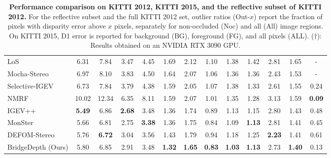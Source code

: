 \begin{table}[!t]
{\begin{tabular}{l c c c c c c c c c c c c}
		LoS~\cite{li2024local} & 6.31 & 7.84 & 3.47 & 4.45 & 1.69 & 2.12 & 1.10 & 1.38 & 1.42 & 2.81 & 1.65 & - \\
		Mocha-Stereo~\cite{chen2024motif} & 6.97 & 8.10 & 3.83 & 4.50 & 1.64 & 2.07 & 1.06 & 1.36 & 1.36 & \cellcolor{yellow!25}2.43 & 1.53 & - \\
		Selective-IGEV~\cite{wang2024selective} & 6.73 & 7.84 & 3.79 & 4.38 & 1.59 & 2.05 & 1.07 & 1.38 & 1.33 & 2.61 & 1.55 & 0.24 \\
		NMRF~\cite{guan2024neural} & 10.02 & 12.34 & 6.35 & 8.11 & 1.59 & 2.07 & 1.01 & 1.35 & 1.28 & 3.13 & 1.59 & \cellcolor{red!25}\textbf{0.09}\\
		\midrule
		IGEV++~\cite{xu2024igev++} & \cellcolor{red!25}\textbf{5.49} & 6.86 & \cellcolor{red!25}\textbf{2.68} & \cellcolor{yellow!25}3.48 & \cellcolor{yellow!25}1.36 & \cellcolor{yellow!25}1.74 & 0.89 & 1.13 & 1.15 & 2.80 & 1.43 & 0.48 \\
		MonSter~\cite{cheng2025monster} & \cellcolor{yellow!25}5.66 & \cellcolor{yellow!25}6.81 & \cellcolor{yellow!25}2.75 & \cellcolor{red!25}\textbf{3.38} & \cellcolor{yellow!25}1.36 & 1.75 & \cellcolor{yellow!25}0.84 & \cellcolor{yellow!25}1.09 & \cellcolor{red!25}\textbf{1.13} & 2.81 & \cellcolor{yellow!25}1.41 & 0.45\\
		DEFOM-Stereo~\cite{jiang2025defom} & 5.76 & \cellcolor{red!25}\textbf{6.72} & 3.04 & 3.56 & 1.43 & 1.79 & 0.94 & 1.18 & 1.25 & \cellcolor{red!25}\textbf{2.23} & \cellcolor{yellow!25}1.41 & 0.61\\
		BridgeDepth (Ours) & 5.80 & 6.85 & 2.91 & \cellcolor{yellow!25}3.48 & \cellcolor{red!25}\textbf{1.32} & \cellcolor{red!25}\textbf{1.65} & \cellcolor{red!25}\textbf{0.83} & \cellcolor{red!25}\textbf{1.03} & \cellcolor{red!25}\textbf{1.13} & 2.73 & \cellcolor{red!25}\textbf{1.40} & \cellcolor{yellow!25}0.13\\
		\bottomrule
	\end{tabular}
	}
	\vspace{-0.5em}
	\caption{\textbf{Performance comparison on KITTI 2012, KITTI 2015, and the reflective subset of KITTI 2012.} 
	For the reflective subset and the full KITTI 2012 set, outlier ratios (Out-$x$) report the fraction of pixels with disparity error above $x$ pixels, separately for non-occluded (Noc) and all (All) image regions. 
	On KITTI 2015, D1 error is reported for background (BG), foreground (FG), and all pixels (ALL). ($\dag$): Results obtained on an NVIDIA RTX 3090 GPU.}
	\label{tab:bridge_results_kitti}
	\vspace{-0.5em}
\end{table}

